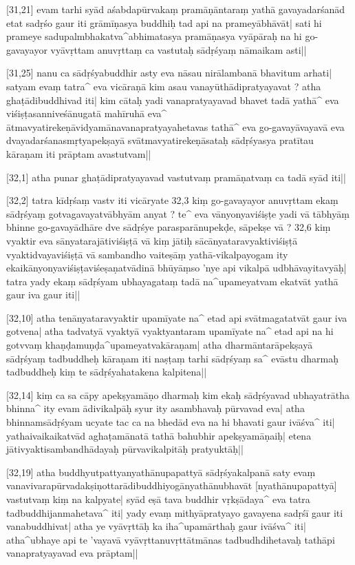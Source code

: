 [31,21] evam tarhi syād aśabdapūrvakaṃ pramāṇāntaraṃ yathā gavayadarśanād etat sadṛśo gaur iti grāmīṇasya buddhiḥ tad api na 
prameyābhāvāt| sati hi prameye sadupalmbhakatva^abhimatasya pramāṇasya vyāpāraḥ na hi go-gavayayor vyāvṛttam anuvṛttaṃ ca vastutaḥ sādṛśyaṃ nāmaikam asti||

[31,25] nanu ca sādṛśyabuddhir asty eva nāsau nirālambanā bhavitum arhati| satyam evaṃ tatra^ eva vicāraṇā kim asau vanayūthādipratyayavat ? atha ghaṭādibuddhivad iti| kim cātaḥ yadi vanapratyayavad bhavet tadā yathā^ eva viśiṣṭasanniveśānugatā mahīruhā eva^ ātmavyatirekeṇāvidyamānavanapratyayahetavas tathā^ eva go-gavayāvayavā eva dvayadarśanasmṛtyapekṣayā svātmavyatirekeṇāsataḥ sādṛśyasya 
pratītau kāraṇam iti prāptam avastutvam||

[32,1] atha punar ghaṭādipratyayavad vastutvaṃ pramāṇatvaṃ ca tadā syād iti||

[32,2] tatra kīdṛśaṃ vastv iti vicāryate 32,3  kiṃ go-gavayayor anuvṛttam ekaṃ sādṛśyaṃ gotvagavayatvābhyām anyat ? te^ eva vānyonyaviśiṣṭe yadi vā tābhyāṃ bhinne go-gavayādhāre dve sādṛśye parasparānupekḍe, sāpekṣe vā ? 32,6  kiṃ vyaktir eva sānyatarajātiviśiṣṭā vā kiṃ jātiḥ sācānyataravyaktiviśiṣṭā vyaktidvayaviśiṣṭā vā sambandho vaiteṣāṃ yathā-vikalpayogam ity ekaikānyonyaviśiṣṭaviśeṣaṇatvādinā bhūyāṃso 'nye api vikalpā udbhāvayitavyāḥ| tatra yady ekaṃ sādṛśyam ubhayagataṃ tadā na^upameyatvam ekatvāt yathā gaur iva gaur iti||

[32,10] atha tenānyataravyaktir upamīyate na^ etad api svātmagatatvāt gaur iva gotvena| atha tadvatyā vyaktyā vyaktyantaram upamīyate na^ etad api na hi gotvvaṃ khaṇḍamuṇḍa^upameyatvakāraṇam| atha dharmāntarāpekṣayā sādṛśyaṃ tadbuddheḥ kāraṇam iti naṣṭaṃ tarhi sādṛśyaṃ sa^ evāstu dharmaḥ tadbuddheḥ kiṃ te sādṛśyahatakena kalpitena||

[32,14] kiṃ ca sa cāpy apekṣyamāṇo dharmaḥ kim ekaḥ sādṛśyavad ubhayatrātha bhinna^ ity evam ādivikalpāḥ syur ity asambhavaḥ pūrvavad eva| atha bhinnam\ṃ sādṛśyam ucyate tac ca na bhedād eva na hi bhavati gaur ivāśva^ iti| yathaivaikaikatvād aghaṭamānatā tathā bahubhir apekṣyamāṇaiḥ| etena jātivyaktisambandhādayaḥ pūrvavikalpitāḥ 
pratyuktāḥ||

[32,19] atha buddhyutpattyanyathānupapattyā sādṛśyakalpanā saty evaṃ vanavivarapūrvadakṣiṇottarādibuddhiyogānyathānubhavāt [nyathānupapattyā] vastutvaṃ kiṃ na kalpyate| syād eṣā tava buddhir vṛkṣādaya^ eva tatra tadbuddhijanmahetava^ iti| yady evaṃ mithyāpratyayo gavayena sadṛśī gaur iti vanabuddhivat| atha ye vyāvṛttāḥ ka iha^upamārthaḥ gaur ivāśva^ iti| atha^ubhaye api te 'vayavā vyāvṛttanuvṛttātmānas tadbudhdihetavaḥ tathāpi vanapratyayavad eva 
prāptam||

